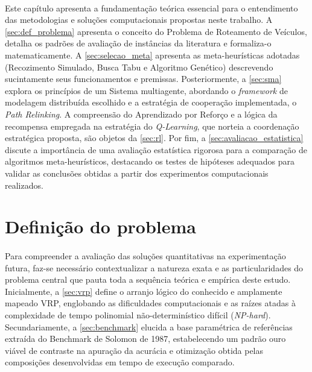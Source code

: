 \paragraph{}Este capítulo apresenta a fundamentação teórica essencial para o entendimento das metodologias e soluções computacionais propostas neste trabalho. A \autoref{sec:def_problema} apresenta o conceito do Problema de Roteamento de Veículos, detalha os padrões de avaliação de instâncias da literatura e formaliza-o matematicamente. A \autoref{sec:selecao_meta} apresenta as meta-heurísticas adotadas (Recozimento Simulado, Busca Tabu e Algoritmo Genético) descrevendo sucintamente seus funcionamentos e premissas. Posteriormente, a \autoref{sec:sma} explora os princípios de um Sistema multiagente, abordando o \textit{framework} de modelagem distribuída escolhido e a estratégia de cooperação implementada, o \textit{Path Relinking}. A compreensão do Aprendizado por Reforço e a lógica da recompensa empregada na estratégia do \textit{Q-Learning}, que norteia a coordenação estratégica proposta, são objetos da \autoref{sec:rl}. Por fim, a \autoref{sec:avaliacao_estatistica} discute a importância de uma avaliação estatística rigorosa para a comparação de algoritmos meta-heurísticos, destacando os testes de hipóteses adequados para validar as conclusões obtidas a partir dos experimentos computacionais realizados.

\section{Definição do problema}
\label{sec:def_problema}

\paragraph{}Para compreender a avaliação das soluções quantitativas na experimentação futura, faz-se necessário contextualizar a natureza exata e as particularidades do problema central que pauta toda a sequência teórica e empírica deste estudo. Inicialmente, a \autoref{sec:vrp} define o arranjo lógico do conhecido e amplamente mapeado VRP, englobando as dificuldades computacionais e as raízes atadas à complexidade de tempo polinomial não-determinístico difícil (\textit{NP-hard}). Secundariamente, a \autoref{sec:benchmark} elucida a base paramétrica de referências extraída do Benchmark de Solomon de 1987, estabelecendo um padrão ouro viável de contraste na apuração da acurácia e otimização obtida pelas composições desenvolvidas em tempo de execução comparado.

